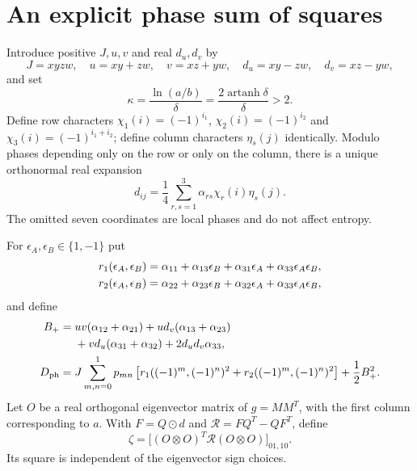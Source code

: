 \documentclass[11pt]{article}
\begin{document}
\section{An explicit phase sum of squares}
Introduce positive $J,u,v$ and real $d_u,d_v$ by
\begin{equation}\label{eq:uv}
 J=xyzw,\quad u=xy+zw,\quad v=xz+yw,\quad
 d_u=xy-zw,\quad d_v=xz-yw,
\end{equation}
and set
\begin{equation}\label{eq:kappa}
 \kappa=\frac{\ln(a/b)}{\delta}
        =\frac{2\operatorname{artanh}\delta}{\delta}>2.
\end{equation}
Define row characters
$\chi_1(i)=(-1)^{i_1}$, $\chi_2(i)=(-1)^{i_2}$ and
$\chi_3(i)=(-1)^{i_1+i_2}$; define column characters $\eta_s(j)$ identically. Modulo phases depending only on the row or only on the column, there is a unique orthonormal real expansion
\begin{equation}\label{eq:characters}
 d_{ij}=\frac14\sum_{r,s=1}^3\alpha_{rs}\chi_r(i)\eta_s(j).
\end{equation}
The omitted seven coordinates are local phases and do not affect entropy.

For $\epsilon_A,\epsilon_B\in\{1,-1\}$ put
\begin{align}\label{eq:r12}
 r_1(\epsilon_A,\epsilon_B)&=\alpha_{11}+\alpha_{13}\epsilon_B
                  +\alpha_{31}\epsilon_A+\alpha_{33}\epsilon_A\epsilon_B,\notag\\
 r_2(\epsilon_A,\epsilon_B)&=\alpha_{22}+\alpha_{23}\epsilon_B
                  +\alpha_{32}\epsilon_A+\alpha_{33}\epsilon_A\epsilon_B,
\end{align}
and define
\begin{align}\label{eq:Dphase}
 B_+={}&uv(\alpha_{12}+\alpha_{21})
       +u d_v(\alpha_{13}+\alpha_{23})\notag\\
      &+v d_u(\alpha_{31}+\alpha_{32})+2d_ud_v\alpha_{33},\notag\\
 D_{\mathrm{ph}}={}&J\sum_{m,n=0}^1p_{mn}
       \left[r_1((-1)^m,(-1)^n)^2+r_2((-1)^m,(-1)^n)^2\right]
       +\frac12 B_+^2.
\end{align}
Let $O$ be a real orthogonal eigenvector matrix of $g=MM^T$, with the first column corresponding to $a$. With $F=Q\odot d$ and $\mathcal R=FQ^T-QF^T$, define
\begin{equation}\label{eq:zeta}
 \zeta=\bigl[(O\otimes O)^T\mathcal R(O\otimes O)\bigr]_{01,10}.
\end{equation}
Its square is independent of the eigenvector sign choices.
\end{document}
